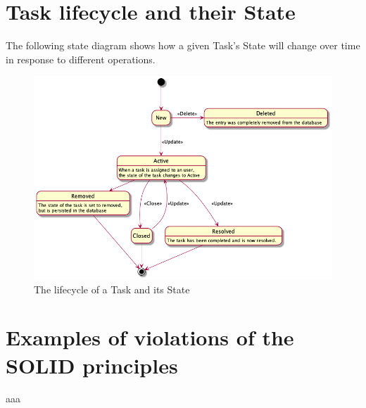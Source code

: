 \documentclass[12pt,letterpaper]{article}
\begin{document}
\section*{Task lifecycle and their State}

The following state diagram shows how a given Task's State will change over time in response to different operations.

\begin{figure}[h]
    \center
    \includegraphics[scale=0.5]{../out/Documents/plantuml/exercise3/exercise3.png}
    \caption{The lifecycle of a Task and its State}
    \label{uml.exercise3}
\end{figure}

\pagebreak
\section*{Examples of violations of the SOLID principles}

aaa
\end{document}
